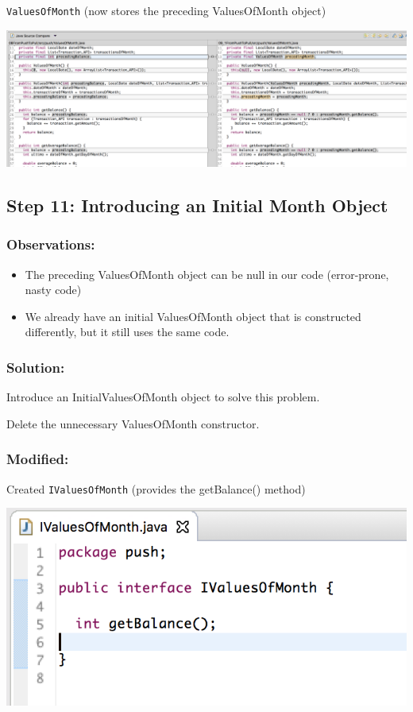 \documentclass[a4paper,fleqn,titlepage,11pt]{article}
\begin{document}
\texttt{ValuesOfMonth} (now stores the preceding ValuesOfMonth object)

\includegraphics[width=1\textwidth]{CompareViews/09-10-2.png}



\subsection*{Step 11: Introducing an Initial Month Object}

\subsubsection*{Observations:}
\begin{itemize}
\item The preceding ValuesOfMonth object can be null in our code (error-prone, nasty code)
\item We already have an initial ValuesOfMonth object that is constructed differently, but it still uses the same code.
\end{itemize}

\subsubsection*{Solution:}

Introduce an InitialValuesOfMonth object to solve this problem.

Delete the unnecessary ValuesOfMonth constructor.

\subsubsection*{Modified:}

Created \texttt{IValuesOfMonth} (provides the getBalance() method)

\includegraphics[width=1\textwidth]{CompareViews/11-3.png}
\end{document}
